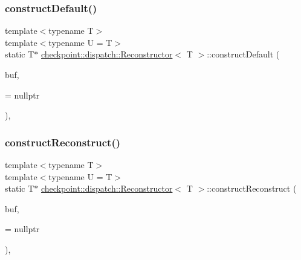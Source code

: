 \mbox{\label{structcheckpoint_1_1dispatch_1_1_reconstructor_a74ded346aaee98f25dc498322e6e1411}} 
\subsubsection{\texorpdfstring{construct\+Default()}{constructDefault()}\hspace{0.1cm}{\footnotesize\ttfamily [2/2]}}
{\footnotesize\ttfamily template$<$typename T$>$ \\
template$<$typename U  = T$>$ \\
static T$\ast$ \hyperlink{structcheckpoint_1_1dispatch_1_1_reconstructor}{checkpoint\+::dispatch\+::\+Reconstructor}$<$ T $>$\+::construct\+Default (\begin{DoxyParamCaption}\item[{void $\ast$}]{buf,  }\item[{\hyperlink{namespacecheckpoint_a4032c86e7c92702198dd675a2696ee2c}{is\+Not\+Default\+Cons\+Type}$<$ U $>$ $\ast$}]{ = {\ttfamily nullptr} }\end{DoxyParamCaption})\hspace{0.3cm}{\ttfamily [inline]}, {\ttfamily [static]}}

\mbox{\label{structcheckpoint_1_1dispatch_1_1_reconstructor_a86a95e9ca24e30a627ed6626f19db4a2}} 
\subsubsection{\texorpdfstring{construct\+Reconstruct()}{constructReconstruct()}\hspace{0.1cm}{\footnotesize\ttfamily [1/4]}}
{\footnotesize\ttfamily template$<$typename T$>$ \\
template$<$typename U  = T$>$ \\
static T$\ast$ \hyperlink{structcheckpoint_1_1dispatch_1_1_reconstructor}{checkpoint\+::dispatch\+::\+Reconstructor}$<$ T $>$\+::construct\+Reconstruct (\begin{DoxyParamCaption}\item[{void $\ast$}]{buf,  }\item[{\hyperlink{namespacecheckpoint_a126da7cae6bbbec231bb2552dc3ad6cc}{is\+Reconstructible\+Type}$<$ U $>$ $\ast$}]{ = {\ttfamily nullptr} }\end{DoxyParamCaption})\hspace{0.3cm}{\ttfamily [inline]}, {\ttfamily [static]}}

